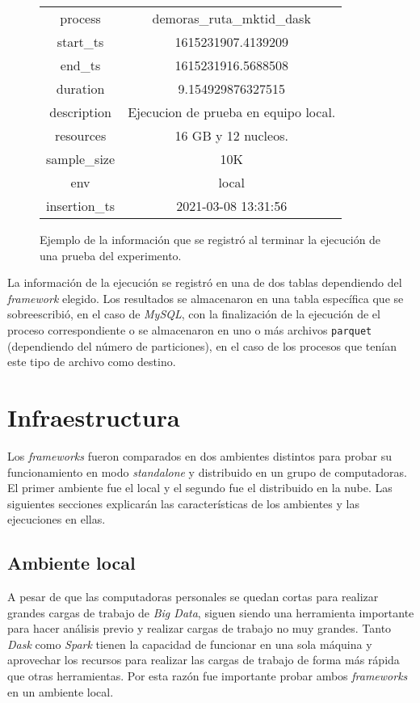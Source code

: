 \begin{figure}
\begin{center}
\begin{tabular}{|c|c|}
 \hline
  process & demoras\_ruta\_mktid\_dask \\ 
  start\_ts & 1615231907.4139209 \\
  end\_ts & 1615231916.5688508 \\ 
  duration & 9.154929876327515 \\ 
  description & Ejecucion de prueba en equipo local. \\
  resources & 16 GB y 12 nucleos. \\
  sample\_size & 10K \\
  env & local \\
  insertion\_ts & 2021-03-08 13:31:56 \\
  \hline
\end{tabular}
\end{center}
\caption{Ejemplo de la información que se registró al terminar la ejecución de una prueba del experimento.}
\end{figure}


La información de la ejecución se registró en una de dos tablas dependiendo del \textit{framework} elegido. Los resultados se almacenaron en una tabla específica que se sobreescribió, en el caso de \textit{MySQL}, con la finalización de la ejecución de el proceso correspondiente o se almacenaron en uno o más archivos \texttt{parquet} (dependiendo del número de particiones), en el caso de los procesos que tenían este tipo de archivo como destino. 

\section{Infraestructura}

Los \textit{frameworks} fueron comparados en dos ambientes distintos para probar su funcionamiento en modo \textit{standalone} y distribuido en un grupo de computadoras. El primer ambiente fue el local y el segundo fue el distribuido en la nube. Las siguientes secciones explicarán las características de los ambientes y las ejecuciones en ellas.

\subsection{Ambiente local}

A pesar de que las computadoras personales se quedan cortas para realizar grandes cargas de trabajo de \textit{Big Data}, siguen siendo una herramienta importante para hacer análisis previo y realizar cargas de trabajo no muy grandes. Tanto \textit{Dask} como \textit{Spark} tienen la capacidad de funcionar en una sola máquina y aprovechar los recursos para realizar las cargas de trabajo de forma más rápida que otras herramientas. Por esta razón fue importante probar ambos \textit{frameworks} en un ambiente local. 

